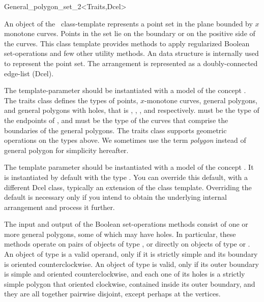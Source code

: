 \ccRefPageBegin

\begin{ccRefClass}{General_polygon_set_2<Traits,Dcel>}

\ccThreeToTwo
    
\ccDefinition
An object of the \ccClassTemplateName\ class-template represents a
point set in the plane bounded by $x$ monotone curves. Points in the set
lie on the boundary or on the positive side of the curves. This class 
template provides methods to apply regularized Boolean set-operations and 
few other utility methods. An  data structure is 
internally used to represent the point set. The arrangement is
represented as a doubly-connected edge-list ({\sc Dcel}).

The  template-parameter should be instantiated with a
model of the concept . The traits class
defines the types of points, $x$-monotone curves, general polygons,
and general polygons with holes, that is ,
, , and 
 respectively.  must 
be the type of the endpoints of , and 
 must be the type of the curves that comprise
the boundaries of the general polygons. The traits class supports geometric 
operations on the types above. We sometimes use the term {\em polygon} instead
of general polygon for simplicity hereafter.

The template parameter  should be instantiated with a
model of the concept . It is instantiated
by default with the type . You can override 
this default, with a different {\sc Dcel} class, typically an extension
of the  class template. Overriding the default is 
necessary only if you intend to obtain the underlying internal arrangement 
and process it further.

The input and output of the Boolean set-operations methods consist of one 
or more general polygons, some of which may have holes. In particular, 
these methods operate on pairs of objects of type \ccClassTemplateName, or
directly on objects of type  or 
. An object of type 
 is a valid operand, only if it is strictly simple 
and its boundary is oriented counterclockwise. An object of type
 is valid, only if 
 its outer boundary is simple and oriented counterclockwise, and each one of 
 its holes is a strictly simple polygon that oriented clockwise, contained inside its outer 
 boundary, and they are all together pairwise disjoint, except perhaps at the vertices.


\end{ccRefClass}
